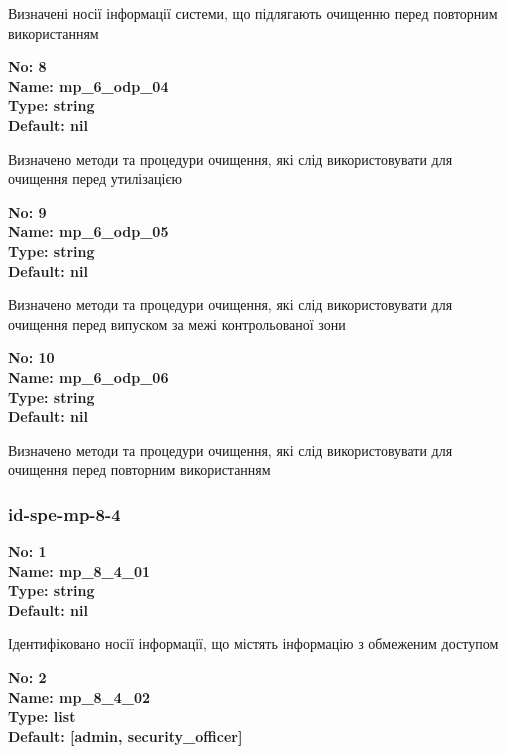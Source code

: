 \documentclass{article}
\begin{document}
{\footnotesize Визначені носії інформації системи, що підлягають очищенню перед повторним використанням}


{\footnotesize\bfseries
No: 8\\
Name: mp\_\allowbreak{}6\_\allowbreak{}odp\_\allowbreak{}04\\
Type: string\\
Default: nil
}

{\footnotesize Визначено методи та процедури очищення, які слід використовувати для очищення перед утилізацією}


{\footnotesize\bfseries
No: 9\\
Name: mp\_\allowbreak{}6\_\allowbreak{}odp\_\allowbreak{}05\\
Type: string\\
Default: nil
}

{\footnotesize Визначено методи та процедури очищення, які слід використовувати для очищення перед випуском за межі контрольованої зони}


{\footnotesize\bfseries
No: 10\\
Name: mp\_\allowbreak{}6\_\allowbreak{}odp\_\allowbreak{}06\\
Type: string\\
Default: nil
}

{\footnotesize Визначено методи та процедури очищення, які слід використовувати для очищення перед повторним використанням}




\subsubsection{id-spe-mp-8-4}


\vspace{10pt}
{\footnotesize\bfseries
No: 1\\
Name: mp\_\allowbreak{}8\_\allowbreak{}4\_\allowbreak{}01\\
Type: string\\
Default: nil
}

{\footnotesize Ідентифіковано носії інформації, що містять інформацію з обмеженим доступом}


{\footnotesize\bfseries
No: 2\\
Name: mp\_\allowbreak{}8\_\allowbreak{}4\_\allowbreak{}02\\
Type: list\\
Default: [\textquotedbl{}admin\textquotedbl{}, \textquotedbl{}security\_\allowbreak{}officer\textquotedbl{}]
}
\end{document}
